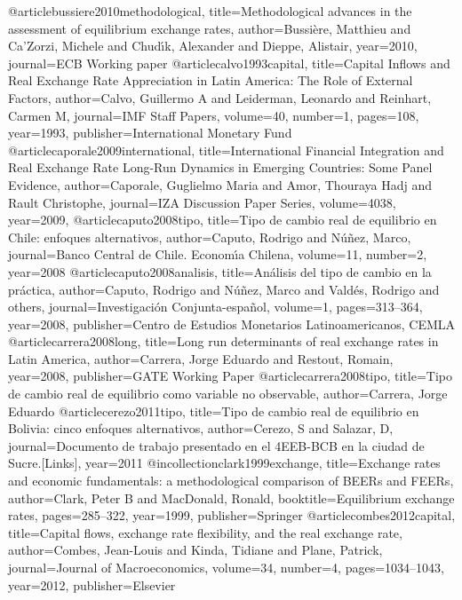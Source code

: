 @article{bussiere2010methodological,
  title={Methodological advances in the assessment of equilibrium exchange rates},
  author={Bussi{\`e}re, Matthieu and Ca'Zorzi, Michele and Chud{\'\i}k, Alexander and Dieppe, Alistair},
  year={2010},
  journal={ECB Working paper}
}
@article{calvo1993capital,
  title={Capital Inflows and Real Exchange Rate Appreciation in Latin America: The Role of External Factors},
  author={Calvo, Guillermo A and Leiderman, Leonardo and Reinhart, Carmen M},
  journal={IMF Staff Papers},
  volume={40},
  number={1},
  pages={108},
  year={1993},
  publisher={International Monetary Fund}
}
@article{caporale2009international,
  title={International Financial Integration and Real Exchange Rate Long-Run Dynamics in Emerging Countries: Some Panel Evidence},
  author={Caporale, Guglielmo Maria and Amor, Thouraya Hadj and Rault Christophe},
  journal={IZA Discussion Paper Series},
  volume={4038},
  year={2009},}
@article{caputo2008tipo,
  title={Tipo de cambio real de equilibrio en Chile: enfoques alternativos},
  author={Caputo, Rodrigo and N{\'u}{\~n}ez, Marco},
  journal={Banco Central de Chile. Econom{\'\i}a Chilena},
  volume={11},
  number={2},
  year={2008}
}
@article{caputo2008analisis,
  title={An{\'a}lisis del tipo de cambio en la pr{\'a}ctica},
  author={Caputo, Rodrigo and N{\'u}{\~n}ez, Marco and Vald{\'e}s, Rodrigo and others},
  journal={Investigaci{\'o}n Conjunta-espa{\~n}ol},
  volume={1},
  pages={313--364},
  year={2008},
  publisher={Centro de Estudios Monetarios Latinoamericanos, CEMLA}
}
@article{carrera2008long,
  title={Long run determinants of real exchange rates in Latin America},
  author={Carrera, Jorge Eduardo and Restout, Romain},
  year={2008},
  publisher={GATE Working Paper}
}
@article{carrera2008tipo,
  title={Tipo de cambio real de equilibrio como variable no observable},
  author={Carrera, Jorge Eduardo}
}
@article{cerezo2011tipo,
  title={Tipo de cambio real de equilibrio en Bolivia: cinco enfoques alternativos},
  author={Cerezo, S and Salazar, D},
  journal={Documento de trabajo presentado en el 4EEB-BCB en la ciudad de Sucre.[Links]},
  year={2011}
}
@incollection{clark1999exchange,
  title={Exchange rates and economic fundamentals: a methodological comparison of BEERs and FEERs},
  author={Clark, Peter B and MacDonald, Ronald},
  booktitle={Equilibrium exchange rates},
  pages={285--322},
  year={1999},
  publisher={Springer}
}
@article{combes2012capital,
  title={Capital flows, exchange rate flexibility, and the real exchange rate},
  author={Combes, Jean-Louis and Kinda, Tidiane and Plane, Patrick},
  journal={Journal of Macroeconomics},
  volume={34},
  number={4},
  pages={1034--1043},
  year={2012},
  publisher={Elsevier}
}
